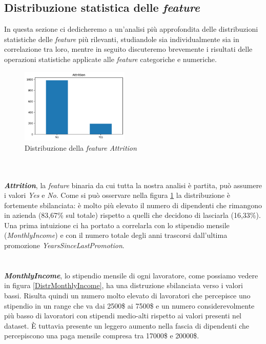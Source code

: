 \subsection{Distribuzione statistica delle \textit{\textit{feature}}}
In questa sezione ci dedicheremo a un'analisi più approfondita delle distribuzioni statistiche delle \textit{\textit{feature}} più rilevanti, studiandole sia individualmente sia in correlazione tra loro, mentre in seguito discuteremo brevemente i risultati delle operazioni statistiche applicate alle \textit{\textit{feature}} categoriche e numeriche.
\begin{figure}
\centering
    \includegraphics[width=0.46\textwidth]{Immagini/Grafico_Attrition.png}
    \setlength{\belowcaptionskip}{-10pt}
    \caption{Distribuzione della \textit{\textit{feature} Attrition}}
    \label{GraficoAttrition}
\end{figure}
\\\\\textbf{\textit{Attrition}}, la \textit{\textit{feature}} binaria da cui tutta la nostra analisi è partita, può assumere i valori \textit{Yes} e \textit{No}. Come si può osservare nella figura \ref{GraficoAttrition} la distribuzione è fortemente sbilanciata: è molto più elevato il numero di dipendenti che rimangono in azienda (83,67\% sul totale) rispetto a quelli che decidono di lasciarla (16,33\%). Una prima intuizione ci ha portato a correlarla con lo stipendio mensile (\textit{MonthlyIncome}) e con il numero totale degli anni trascorsi dall'ultima promozione \textit{YearsSinceLastPromotion}.
\\\\\\
\textbf{\textit{MonthlyIncome}}, lo stipendio mensile di ogni lavoratore, come possiamo vedere in figura \ref{DistrMonthlyIncome}, ha una distruzione sbilanciata verso i valori bassi. Risulta quindi un numero molto elevato di lavoratori che percepisce uno stipendio in un range che va dai 2500\$ ai 7500\$ e un numero considerevolmente più basso di lavoratori con stipendi medio-alti rispetto ai valori presenti nel dataset. È tuttavia presente un leggero aumento nella fascia di dipendenti che percepiscono una paga mensile compresa tra 17000\$ e 20000\$.
